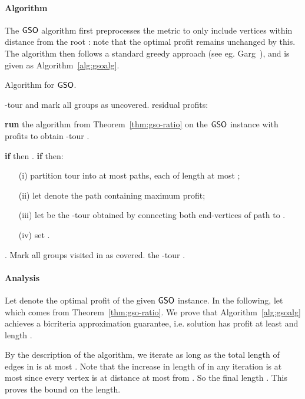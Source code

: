 \documentclass[11pt]{article}
\def\gso{\ensuremath{{\sf GSO}}\xspace}
\begin{document}
\paragraph{Algorithm}
The \gso algorithm first preprocesses the metric to only include  vertices within distance  from the root : note that the optimal profit remains unchanged by this.   The algorithm then follows a standard greedy approach (see
  eg. Garg~\cite{garg0}), and is given as Algorithm~\ref{alg:gsoalg}. 
  
\begin{algorithm}[!h]
  \caption{Algorithm for \gso.}
\label{alg:gsoalg}
\begin{algorithmic}[1]
     -tour  and mark  all groups as uncovered.
     residual profits:
      
    \STATE\label{step:gso-ratio} {\bf run} the algorithm from Theorem~\ref{thm:gso-ratio} on the \gso instance with profits 
     to obtain -tour .
    
    
   \STATE \label{step:gso-case1} {\bf if}  then
      .
    \STATE \label{step:gso-case2} {\bf if}  then:
\begin{itemize}
\item[(i)] partition tour  into at most  paths,
      each of length at most ;
    \item[(ii)]  let  denote the path containing maximum profit;
    \item[(iii)]  let  be the -tour obtained by connecting both end-vertices of path  to .
    \item[(iv)] set .
    \end{itemize}
     . Mark all groups visited in  as
      covered.
  \ENDWHILE
   the -tour .
  \end{algorithmic}
\end{algorithm}

  \paragraph{Analysis}
  Let  denote the optimal profit of the given \gso instance.
 In the following, let
   which comes from Theorem~\ref{thm:gso-ratio}.
  We  prove that Algorithm~\ref{alg:gsoalg} achieves a  bicriteria
  approximation guarantee, i.e. solution  has profit at least  and length . 
  
  By the description of the algorithm, we iterate as long
  as the total length of edges in  is at most  . Note that the increase in length of  in any iteration is at most
   since every vertex is at distance at
  most  from . So the final length . This proves
  the bound on the length. 
  
\end{document}
